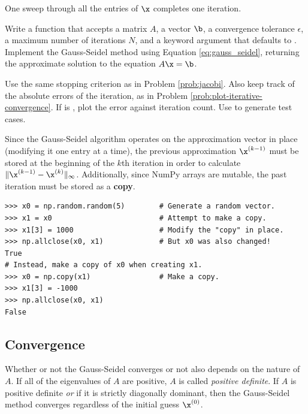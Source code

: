 One sweep through all the entries of $\x$ completes one iteration.

\begin{problem} %
Write a function that accepts a matrix $A$, a vector $\b$, a convergence tolerance $\epsilon$, a maximum number of iterations $N$, and a keyword argument  that defaults to .
Implement the Gauss-Seidel method using Equation \ref{eq:gauss_seidel}, returning the approximate solution to the equation $A\x = \b$.

Use the same stopping criterion as in Problem \ref{prob:jacobi}.
Also keep track of the absolute errors of the iteration, as in Problem \ref{prob:plot-iterative-convergence}.
If  is , plot the error against iteration count.
Use  to generate test cases.

\begin{warn}
Since the Gauss-Seidel algorithm operates on the approximation vector in place (modifying it one entry at a time), the previous approximation $\x^{(k-1)}$ must be stored at the beginning of the $k$th iteration in order to calculate $\|\x^{(k-1)} - \x^{(k)}\|_\infty$.
Additionally, since NumPy arrays are mutable, the past iteration must be stored as a \textbf{copy}.

\begin{lstlisting}
>>> x0 = np.random.random(5)        # Generate a random vector.
>>> x1 = x0                         # Attempt to make a copy.
>>> x1[3] = 1000                    # Modify the "copy" in place.
>>> np.allclose(x0, x1)             # But x0 was also changed!
True
# Instead, make a copy of x0 when creating x1.
>>> x0 = np.copy(x1)                # Make a copy.
>>> x1[3] = -1000
>>> np.allclose(x0, x1)
False
\end{lstlisting}
\end{warn}

\label{prob:gauss_seidel}
\end{problem}

\subsection*{Convergence} %

Whether or not the Gauss-Seidel converges or not also depends on the nature of $A$.
If all of the eigenvalues of $A$ are positive, $A$ is called \emph{positive definite}.
If $A$ is positive definite \emph{or} if it is strictly diagonally dominant, then the Gauss-Seidel method converges regardless of the initial guess $\x^{(0)}$.

